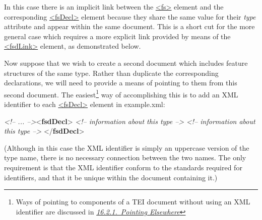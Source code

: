 In this case there is an implicit link between the \hyperref[TEI.fs]{<fs>} element and the corresponding \hyperref[TEI.fsDecl]{<fsDecl>} element because they share the same value for their {\itshape type} attribute and appear within the same document. This is a short cut for the more general case which requires a more explicit link provided by means of the \hyperref[TEI.fsdLink]{<fsdLink>} element, as demonstrated below.\par
Now suppose that we wish to create a second document which includes feature structures of the same type. Rather than duplicate the corresponding declarations, we will need to provide a means of pointing to them from this second document. The easiest\footnote{Ways of pointing to components of a TEI document without using an XML identifier are discussed in \textit{\hyperref[SAUR]{16.2.1.\ Pointing Elsewhere}}} way of accomplishing this is to add an XML identifier to each \hyperref[TEI.fsDecl]{<fsDecl>} element in \textsf{example.xml}: \par\bgroup{}\exampleFont \begin{shaded}\noindent\mbox{}\mbox{}\newline 
\textit{<!-- ... -->}{<\textbf{fsdDecl}>}\mbox{}\newline 
{}\mbox{}\newline 
\textit{<!-- information about this type -->}\mbox{}\newline 
{}\mbox{}\newline 
{}\mbox{}\newline 
\textit{<!-- information about this type -->}\mbox{}\newline 
{}\mbox{}\newline 
{</\textbf{fsdDecl}>}\end{shaded}\egroup\par \noindent  (Although in this case the XML identifier is simply an uppercase version of the type name, there is no necessary connection between the two names. The only requirement is that the XML identifier conform to the standards required for identifiers, and that it be unique within the document containing it.)\par
